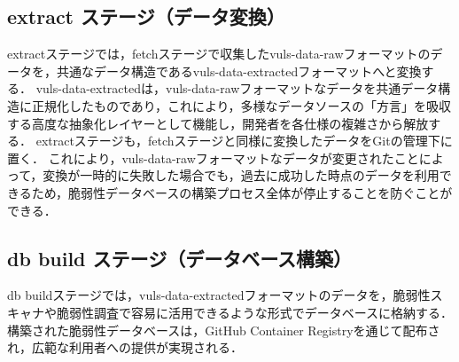 \subsection{extract ステージ（データ変換）}
extractステージでは，fetchステージで収集したvuls-data-rawフォーマットのデータを，共通なデータ構造であるvuls-data-extractedフォーマットへと変換する．
vuls-data-extractedは，vuls-data-rawフォーマットなデータを共通データ構造に正規化したものであり，これにより，多様なデータソースの「方言」を吸収する高度な抽象化レイヤーとして機能し，開発者を各仕様の複雑さから解放する．
extractステージも，fetchステージと同様に変換したデータをGitの管理下に置く．
これにより，vuls-data-rawフォーマットなデータが変更されたことによって，変換が一時的に失敗した場合でも，過去に成功した時点のデータを利用できるため，脆弱性データベースの構築プロセス全体が停止することを防ぐことができる．


\subsection{db build ステージ（データベース構築）}
db buildステージでは，vuls-data-extractedフォーマットのデータを，脆弱性スキャナや脆弱性調査で容易に活用できるような形式でデータベースに格納する．
構築された脆弱性データベースは，GitHub Container Registryを通じて配布され，広範な利用者への提供が実現される．
